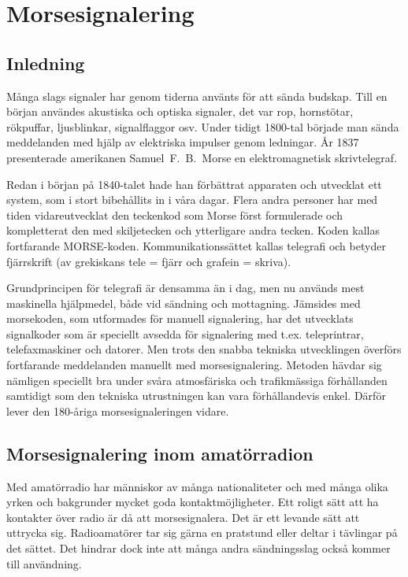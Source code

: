 \chapter{Morsesignalering}

\section{Inledning}

Många slags signaler har genom tiderna använts för att sända budskap.
Till en början användes akustiska och optiska signaler, det var rop, hornstötar,
rökpuffar, ljusblinkar, signalflaggor osv.
Under tidigt 1800-tal började man sända meddelanden med hjälp av elektriska
impulser genom ledningar.
År 1837 presenterade amerikanen Samuel~F.~B.~Morse en elektromagnetisk
skrivtelegraf.

Redan i början på 1840-talet hade han förbättrat apparaten och utvecklat ett
system, som i stort bibehållits in i våra dagar.
Flera andra personer har med tiden vidareutvecklat den teckenkod som Morse
först formulerade och kompletterat den med skiljetecken och ytterligare andra
tecken.
Koden kallas fortfarande MORSE-koden.
Kommunikationssättet kallas telegrafi och betyder fjärrskrift (av grekiskans
tele = fjärr och grafein = skriva).

Grundprincipen för telegrafi är densamma än i dag, men nu används mest
maskinella hjälpmedel, både vid sändning och mottagning.
Jämsides med morsekoden, som utformades för manuell signalering, har det
utvecklats signalkoder som är speciellt avsedda för signalering med t.ex.
teleprintrar, telefaxmaskiner och datorer.
Men trots den snabba tekniska utvecklingen överförs fortfarande meddelanden
manuellt med morsesignalering.
Metoden hävdar sig nämligen speciellt bra under svåra atmosfäriska och
trafikmässiga förhållanden samtidigt som den tekniska utrustningen kan vara
förhållandevis enkel.
Därför lever den 180-åriga morsesignaleringen vidare.

\section[Morsesignalering]{Morsesignalering inom amatörradion}

Med amatörradio har människor av många nationaliteter och med många olika yrken
och bakgrunder mycket goda kontaktmöjligheter.
Ett roligt sätt att ha kontakter över radio är då att morsesignalera.
Det är ett levande sätt att uttrycka sig.
Radioamatörer tar sig gärna en pratstund eller deltar i tävlingar på det sättet.
Det hindrar dock inte att många andra sändningsslag också kommer till
användning.

